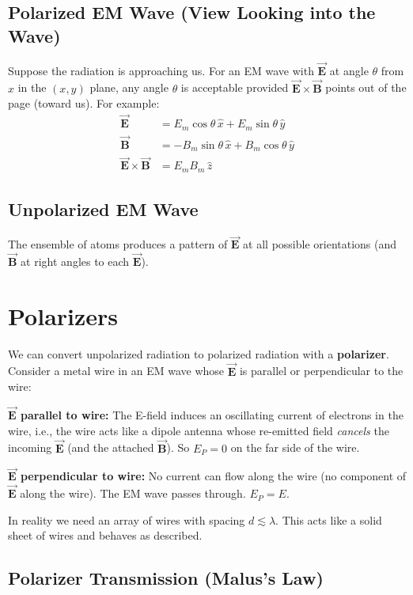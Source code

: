 \documentclass[11pt]{report}
\newcommand{\vbf}[1]{\vec{\mathbf{#1}}}
\begin{document}
\subsection*{Polarized EM Wave (View Looking into the Wave)}

Suppose the radiation is approaching us. For an EM wave with $\vbf{E}$ at angle $\theta$ from $\hat{x}$ in the $(x,y)$ plane, any angle $\theta$ is acceptable provided $\vbf{E}\times\vbf{B}$ points out of the page (toward us). For example:
\begin{align}
\vbf{E} &= E_m \cos\theta\,\hat{x} + E_m \sin\theta\,\hat{y} \\
\vbf{B} &= -B_m \sin\theta\,\hat{x} + B_m \cos\theta\,\hat{y} \\
\vbf{E}\times\vbf{B} &= E_m B_m\,\hat{z}
\end{align}

\subsection*{Unpolarized EM Wave}

The ensemble of atoms produces a pattern of $\vbf{E}$ at all possible orientations (and $\vbf{B}$ at right angles to each $\vbf{E}$).

\section{Polarizers}

We can convert unpolarized radiation to polarized radiation with a \textbf{polarizer}. Consider a metal wire in an EM wave whose $\vbf{E}$ is parallel or perpendicular to the wire:

\textbf{$\vbf{E}$ parallel to wire:} The E-field induces an oscillating current of electrons in the wire, i.e., the wire acts like a dipole antenna whose re-emitted field \emph{cancels} the incoming $\vbf{E}$ (and the attached $\vbf{B}$). So $E_P = 0$ on the far side of the wire.

\textbf{$\vbf{E}$ perpendicular to wire:} No current can flow along the wire (no component of $\vbf{E}$ along the wire). The EM wave passes through. $E_P = E$.

In reality we need an array of wires with spacing $d \lesssim \lambda$. This acts like a solid sheet of wires and behaves as described.

\subsection*{Polarizer Transmission (Malus's Law)}
\end{document}
